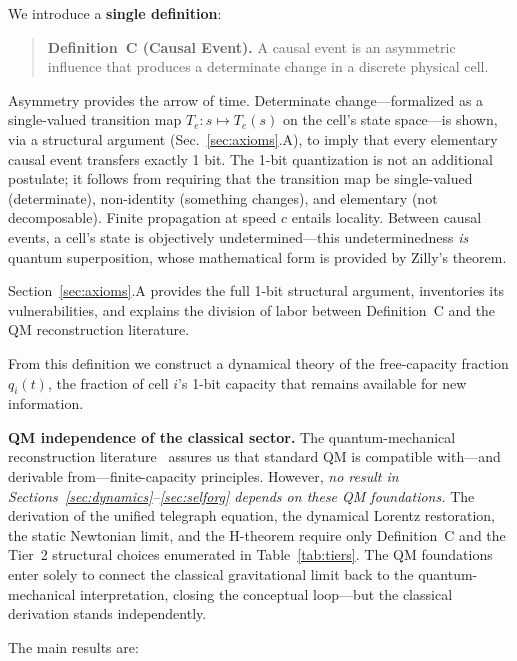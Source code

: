 \documentclass[aps,prd,twocolumn,showpacs,superscriptaddress,preprintnumbers]{revtex4-2}
\begin{document}
We introduce a \textbf{single definition}:

\begin{quote}
\textbf{Definition~C (Causal Event).} A causal event is an asymmetric influence that produces a determinate change in a discrete physical cell.
\end{quote}

Asymmetry provides the arrow of time. Determinate change---formalized as a single-valued transition map $T_e: s \mapsto T_e(s)$ on the cell's state space---is shown, via a structural argument (Sec.~\ref{sec:axioms}.A), to imply that every elementary causal event transfers exactly 1 bit. The 1-bit quantization is not an additional postulate; it follows from requiring that the transition map be single-valued (determinate), non-identity (something changes), and elementary (not decomposable). Finite propagation at speed $c$ entails locality. Between causal events, a cell's state is objectively undetermined---this undeterminedness \emph{is} quantum superposition, whose mathematical form is provided by Zilly's theorem.

Section~\ref{sec:axioms}.A provides the full 1-bit structural argument, inventories its vulnerabilities, and explains the division of labor between Definition~C and the QM reconstruction literature.

From this definition we construct a dynamical theory of the free-capacity fraction $q_i(t)$, the fraction of cell $i$'s 1-bit capacity that remains available for new information.

\textbf{QM independence of the classical sector.} The quantum-mechanical reconstruction literature~\cite{Zeilinger1999,Dakic2011,Chiribella2011,Masanes2011,Shaghaghi2023,Zilly:2026} assures us that standard QM is compatible with---and derivable from---finite-capacity principles. However, \emph{no result in Sections~\ref{sec:dynamics}--\ref{sec:selforg} depends on these QM foundations.} The derivation of the unified telegraph equation, the dynamical Lorentz restoration, the static Newtonian limit, and the H-theorem require only Definition~C and the Tier~2 structural choices enumerated in Table~\ref{tab:tiers}. The QM foundations enter solely to connect the classical gravitational limit back to the quantum-mechanical interpretation, closing the conceptual loop---but the classical derivation stands independently.

The main results are:
\end{document}
